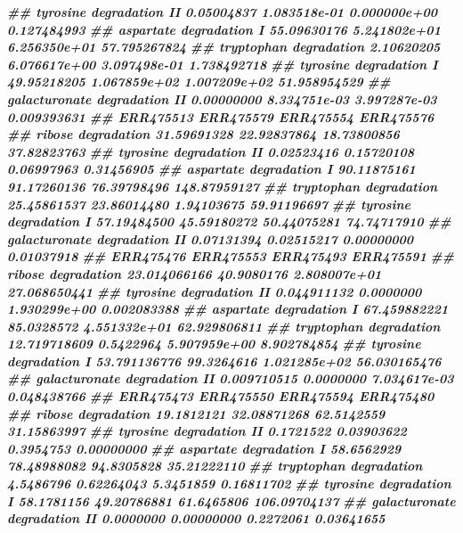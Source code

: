 \documentclass[
]{article}
\newenvironment{Shaded}{\begin{snugshade}}{\end{snugshade}}
\newcommand{\DocumentationTok}[1]{\textcolor[rgb]{0.56,0.35,0.01}{\textbf{\textit{#1}}}}
\begin{document}
\begin{Shaded}
\begin{Highlighting}[]
\DocumentationTok{\#\# tyrosine degradation II       0.05004837 1.083518e{-}01 0.000000e+00  0.127484993}
\DocumentationTok{\#\# aspartate degradation I      55.09630176 5.241802e+01 6.256350e+01 57.795267824}
\DocumentationTok{\#\# tryptophan degradation        2.10620205 6.076617e+00 3.097498e{-}01  1.738492718}
\DocumentationTok{\#\# tyrosine degradation I       49.95218205 1.067859e+02 1.007209e+02 51.958954529}
\DocumentationTok{\#\# galacturonate degradation II  0.00000000 8.334751e{-}03 3.997287e{-}03  0.009393631}
\DocumentationTok{\#\#                                ERR475513   ERR475579   ERR475554    ERR475576}
\DocumentationTok{\#\# ribose degradation           31.59691328 22.92837864 18.73800856  37.82823763}
\DocumentationTok{\#\# tyrosine degradation II       0.02523416  0.15720108  0.06997963   0.31456905}
\DocumentationTok{\#\# aspartate degradation I      90.11875161 91.17260136 76.39798496 148.87959127}
\DocumentationTok{\#\# tryptophan degradation       25.45861537 23.86014480  1.94103675  59.91196697}
\DocumentationTok{\#\# tyrosine degradation I       57.19484500 45.59180272 50.44075281  74.74717910}
\DocumentationTok{\#\# galacturonate degradation II  0.07131394  0.02515217  0.00000000   0.01037918}
\DocumentationTok{\#\#                                 ERR475476  ERR475553    ERR475493    ERR475591}
\DocumentationTok{\#\# ribose degradation           23.014066166 40.9080176 2.808007e+01 27.068650441}
\DocumentationTok{\#\# tyrosine degradation II       0.044911132  0.0000000 1.930299e+00  0.002083388}
\DocumentationTok{\#\# aspartate degradation I      67.459882221 85.0328572 4.551332e+01 62.929806811}
\DocumentationTok{\#\# tryptophan degradation       12.719718609  0.5422964 5.907959e+00  8.902784854}
\DocumentationTok{\#\# tyrosine degradation I       53.791136776 99.3264616 1.021285e+02 56.030165476}
\DocumentationTok{\#\# galacturonate degradation II  0.009710515  0.0000000 7.034617e{-}03  0.048438766}
\DocumentationTok{\#\#                               ERR475473   ERR475550  ERR475594    ERR475480}
\DocumentationTok{\#\# ribose degradation           19.1812121 32.08871268 62.5142559  31.15863997}
\DocumentationTok{\#\# tyrosine degradation II       0.1721522  0.03903622  0.3954753   0.00000000}
\DocumentationTok{\#\# aspartate degradation I      58.6562929 78.48988082 94.8305828  35.21222110}
\DocumentationTok{\#\# tryptophan degradation        4.5486796  0.62264043  5.3451859   0.16811702}
\DocumentationTok{\#\# tyrosine degradation I       58.1781156 49.20786881 61.6465806 106.09704137}
\DocumentationTok{\#\# galacturonate degradation II  0.0000000  0.00000000  0.2272061   0.03641655}
\end{Highlighting}
\end{Shaded}
\end{document}
